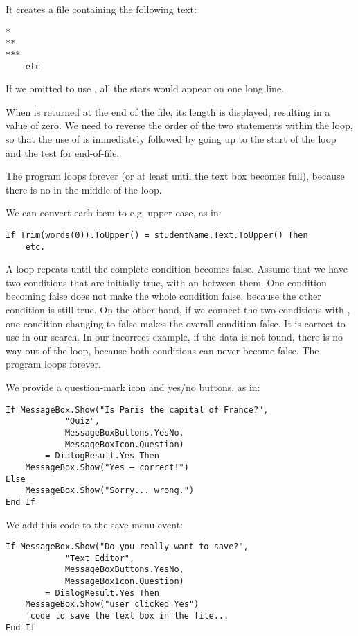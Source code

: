 		\begin{stab}
			\begin{enumChapter}
				\item	It creates a file containing the following text:
					\begin{verbatim}
*
**
***
	etc
					\end{verbatim}
					If we omitted to use , all the stars would appear on one long line.
				\item	When  is returned at the end of the file, its length is displayed, resulting in a value of zero. We need to reverse the order of the two statements within the loop, so that the use of  is immediately followed by going up to the start of the loop and the test for end-of-file.
				\item	The program loops forever (or at least until the text box becomes full), because there is no  in the middle of the loop.
				\item	We can convert each item to e.g. upper case, as in:
					\begin{lstlisting}
If Trim(words(0)).ToUpper() = studentName.Text.ToUpper() Then
	etc.
					\end{lstlisting}
				\item	A  loop repeats until the complete condition becomes false. Assume that we have two conditions that are initially true, with an  between them. One condition becoming false does not make the whole condition false, because the other condition is still true.
					On the other hand, if we connect the two conditions with , one condition changing to false makes the overall condition false. It is correct to use  in our search. In our incorrect  example, if the data is not found, there is no way out of the loop, because both conditions can never become false. The program loops forever.
				\item	We provide a question-mark icon and yes/no buttons, as in:
					\begin{lstlisting}
If MessageBox.Show("Is Paris the capital of France?",
			"Quiz",
			MessageBoxButtons.YesNo,
			MessageBoxIcon.Question)
		= DialogResult.Yes Then
	MessageBox.Show("Yes – correct!")	
Else
	MessageBox.Show("Sorry... wrong.")
End If
					\end{lstlisting}
				\item We add this code to the save menu event:
					\begin{lstlisting}
If MessageBox.Show("Do you really want to save?",
			"Text Editor",
			MessageBoxButtons.YesNo,
			MessageBoxIcon.Question)
		= DialogResult.Yes Then
	MessageBox.Show("user clicked Yes")
	'code to save the text box in the file...
End If	
					\end{lstlisting}
			\end{enumChapter}
		\end{stab}

